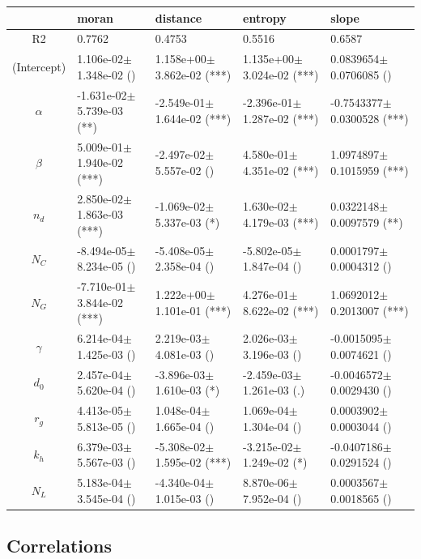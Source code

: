 \begin{center}
\begin{tabular}{|c|p{3.7cm}|p{3.7cm}|p{3.7cm}|p{3.7cm}|}
 \hline
&moran&distance&entropy&slope\\\hline
R2&0.7762&0.4753&0.5516&0.6587\\\hline
(Intercept)&1.106e-02$\pm$ 1.348e-02 ()&1.158e+00$\pm$ 3.862e-02 (***)&1.135e+00$\pm$ 3.024e-02 (***)&0.0839654$\pm$ 0.0706085 ()\\
$\alpha$&-1.631e-02$\pm$ 5.739e-03 (**)&-2.549e-01$\pm$ 1.644e-02 (***)&-2.396e-01$\pm$ 1.287e-02 (***)&-0.7543377$\pm$ 0.0300528 (***)\\
$\beta$&5.009e-01$\pm$ 1.940e-02 (***)&-2.497e-02$\pm$ 5.557e-02 ()&4.580e-01$\pm$ 4.351e-02 (***)&1.0974897$\pm$ 0.1015959 (***)\\
$n_d$&2.850e-02$\pm$ 1.863e-03 (***)&-1.069e-02$\pm$ 5.337e-03 (*)&1.630e-02$\pm$ 4.179e-03 (***)&0.0322148$\pm$ 0.0097579 (**)\\
$N_C$&-8.494e-05$\pm$ 8.234e-05 ()&-5.408e-05$\pm$ 2.358e-04 ()&-5.802e-05$\pm$ 1.847e-04 ()&0.0001797$\pm$ 0.0004312 ()\\
$N_G$&-7.710e-01$\pm$ 3.844e-02 (***)&1.222e+00$\pm$ 1.101e-01 (***)&4.276e-01$\pm$ 8.622e-02 (***)&1.0692012$\pm$ 0.2013007 (***)\\
$\gamma$&6.214e-04$\pm$ 1.425e-03 ()&2.219e-03$\pm$ 4.081e-03 ()&2.026e-03$\pm$ 3.196e-03 ()&-0.0015095$\pm$ 0.0074621 ()\\
$d_0$&2.457e-04$\pm$ 5.620e-04 ()&-3.896e-03$\pm$ 1.610e-03 (*)&-2.459e-03$\pm$ 1.261e-03 (.)&-0.0046572$\pm$ 0.0029430 ()\\
$r_g$&4.413e-05$\pm$ 5.813e-05 ()&1.048e-04$\pm$ 1.665e-04 ()&1.069e-04$\pm$ 1.304e-04 ()&0.0003902$\pm$ 0.0003044 ()\\
$k_h$&6.379e-03$\pm$ 5.567e-03 ()&-5.308e-02$\pm$ 1.595e-02 (***)&-3.215e-02$\pm$ 1.249e-02 (*)&-0.0407186$\pm$ 0.0291524 ()\\
$N_L$&5.183e-04$\pm$ 3.545e-04 ()&-4.340e-04$\pm$ 1.015e-03 ()&8.870e-06$\pm$ 7.952e-04 ()&0.0003567$\pm$ 0.0018565 ()\\
 \hline
\end{tabular}


\end{center}


\vspace{0.5cm}


\subsection*{Correlations}

